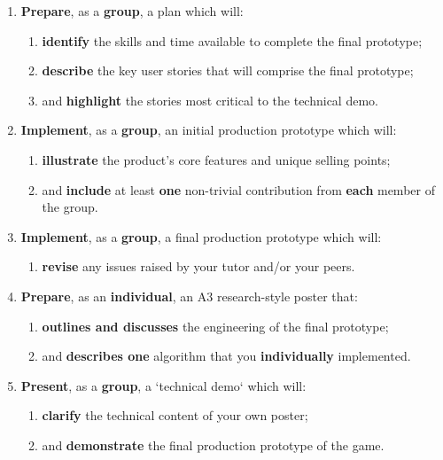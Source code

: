 \documentclass{../fal_assignment}
\begin{document}
\begin{enumerate}[label=(\Alph*)]
    \item \textbf{Prepare}, as a \textbf{group}, a plan which will:
    	\begin{enumerate}[label=\roman*.]
    	    	\item \textbf{identify} the skills and time available to complete the final prototype;
    		\item \textbf{describe} the key user stories that will comprise the final prototype;
    		\item and \textbf{highlight} the stories most critical to the technical demo.
	\end{enumerate}
    \item \textbf{Implement}, as a \textbf{group}, an initial production prototype which will:
    	\begin{enumerate}[label=\roman*.]
    		\item \textbf{illustrate} the product's core features and unique selling points;
    		\item and \textbf{include} at least \textbf{one} non-trivial contribution from \textbf{each} member of the group.
	\end{enumerate}
    \item \textbf{Implement}, as a \textbf{group}, a final production prototype which will:
    	\begin{enumerate}[label=\roman*.]
    		\item \textbf{revise} any issues raised by your tutor and/or your peers.
	\end{enumerate}
    \item \textbf{Prepare}, as an \textbf{individual}, an A3 research-style poster that:
    	\begin{enumerate}[label=\roman*.]
    		\item \textbf{outlines and discusses} the engineering of the final prototype;
    		\item and \textbf{describes one} algorithm that you \textbf{individually} implemented. 
	\end{enumerate}
    \item \textbf{Present}, as a \textbf{group}, a `technical demo` which will:
    	\begin{enumerate}[label=\roman*.]
    		\item \textbf{clarify} the technical content of your own poster;
    		\item and \textbf{demonstrate} the final production prototype of the game.
	\end{enumerate}
\end{enumerate}
  
\end{document}
